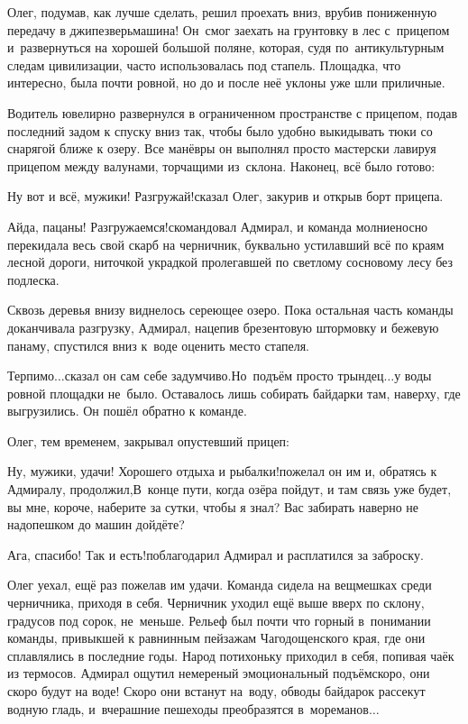 Олег, подумав, как лучше сделать, решил проехать вниз, врубив пониженную передачу в джипе\mdash зверь\nobreakdash\sdash\nobreakdash машина! Он~смог заехать на грунтовку в лес с~прицепом и~развернуться на хорошей большой поляне, которая, судя по~антикультурным следам цивилизации, часто использовалась под стапель. Площадка, что интересно, была почти ровной, но до и после неё уклоны уже шли приличные.

Водитель ювелирно развернулся в ограниченном пространстве с прицепом, подав последний задом к спуску вниз так, чтобы было удобно выкидывать тюки со снарягой ближе к озеру. Все манёвры он выполнял просто мастерски лавируя прицепом между валунами, торчащими из~склона. Наконец, всё было готово:

\diagdash Ну вот и всё, мужики! Разгружай!\mdash сказал Олег, закурив и открыв борт прицепа.

\diagdash Айда, пацаны! Разгружаемся!\mdash скомандовал Адмирал, и команда молниеносно перекидала весь свой скарб на черничник, буквально устилавший всё по краям лесной дороги, ниточкой украдкой пролегавшей по светлому сосновому лесу без подлеска. 

Сквозь деревья внизу виднелось сереющее озеро. Пока остальная часть команды доканчивала разгрузку, Адмирал, нацепив брезентовую штормовку и бежевую панаму, спустился вниз к~воде оценить место стапеля. 

\diagdash Терпимо$\ldots$\mdash сказал он сам себе задумчиво.\mdash Но~подъём просто трындец$\ldots$\mdash у воды ровной площадки не~было. Оставалось лишь собирать байдарки там, наверху, где выгрузились. Он пошёл обратно к команде.

Олег, тем временем, закрывал опустевший прицеп:

\diagdash Ну, мужики, удачи! Хорошего отдыха и рыбалки!\mdash пожелал он им и, обратясь к Адмиралу, продолжил,\mdash В~конце пути, когда озёра пойдут, и там связь уже будет, вы мне, короче, наберите за сутки, чтобы я знал? Вас забирать наверно не надо\mdash пешком до машин дойдёте?

\diagdash Ага, спасибо! Так и есть!\mdash поблагодарил Адмирал и расплатился за заброску.

Олег уехал, ещё раз пожелав им удачи. Команда сидела на вещмешках среди черничника, приходя в себя. Черничник уходил ещё выше вверх по склону, градусов под сорок, не~меньше. Рельеф был почти что горный в~понимании команды, привыкшей к равнинным пейзажам Чагодощенского края, где они сплавлялись в последние годы. Народ потихоньку приходил в себя, попивая чаёк из термосов. Адмирал ощутил немереный эмоциональный подъём\mdash скоро, они скоро будут на воде! Скоро они встанут на~воду, обводы байдарок рассекут водную гладь, и~вчерашние пешеходы преобразятся в~мореманов$\ldots$ 

